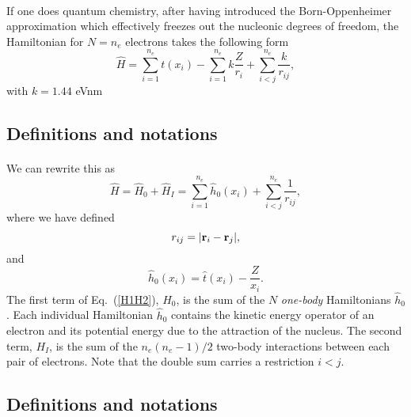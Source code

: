 \documentclass[%
twoside,                 %
final,                   %
10pt]{article}
\begin{document}
\paragraph{}
If one does quantum chemistry, after having introduced the  Born-Oppenheimer approximation which effectively freezes out the nucleonic degrees of freedom, the Hamiltonian for $N=n_e$ electrons takes the following form 
\[
  \hat{H} = \sum_{i=1}^{n_e} t(x_i) - \sum_{i=1}^{n_e} k\frac{Z}{r_i} + \sum_{i < j}^{n_e} \frac{k}{r_{ij}},
\]
with $k=1.44$ eVnm




\subsection{Definitions and notations}

\paragraph{}
We can rewrite this as
\begin{equation}
    \hat{H} = \hat{H}_0 + \hat{H}_I 
    = \sum_{i=1}^{n_e}\hat{h}_0(x_i) + \sum_{i < j}^{n_e}\frac{1}{r_{ij}},
\label{H1H2}
\end{equation}
where  we have defined 
\[
r_{ij}=| {\bf r}_i-{\bf r}_j|,
\]
 and
\begin{equation}
  \hat{h}_0(x_i) =  \hat{t}(x_i) - \frac{Z}{x_i}.
\label{hi}
\end{equation}
The first term of Eq.~(\ref{H1H2}), $H_0$, is the sum of the $N$
\emph{one-body} Hamiltonians $\hat{h}_0$. Each individual
Hamiltonian $\hat{h}_0$ contains the kinetic energy operator of an
electron and its potential energy due to the attraction of the
nucleus. The second term, $H_I$, is the sum of the $n_e(n_e-1)/2$
two-body interactions between each pair of electrons. Note that the double sum carries a restriction $i < j$.




\subsection{Definitions and notations}

\end{document}
